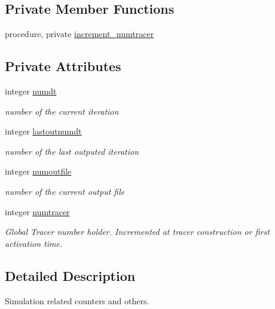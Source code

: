 \subsection*{Private Member Functions}
\begin{DoxyCompactItemize}
\item 
procedure, private \mbox{\hyperlink{structsimulationglobals__mod_1_1sim__t_afef25e0feaad4ec1cff7afd93bc53812}{increment\+\_\+numtracer}}
\end{DoxyCompactItemize}
\subsection*{Private Attributes}
\begin{DoxyCompactItemize}
\item 
integer \mbox{\hyperlink{structsimulationglobals__mod_1_1sim__t_acf2dd4822ebd48541ac6d018038b286a}{numdt}}
\begin{DoxyCompactList}\small\item\em number of the current iteration \end{DoxyCompactList}\item 
integer \mbox{\hyperlink{structsimulationglobals__mod_1_1sim__t_a09270b8350c388b420492cd2209bb1dd}{lastoutnumdt}}
\begin{DoxyCompactList}\small\item\em number of the last outputed iteration \end{DoxyCompactList}\item 
integer \mbox{\hyperlink{structsimulationglobals__mod_1_1sim__t_a5ae529652641c13a5471697d84b5db77}{numoutfile}}
\begin{DoxyCompactList}\small\item\em number of the current output file \end{DoxyCompactList}\item 
integer \mbox{\hyperlink{structsimulationglobals__mod_1_1sim__t_a23cc2df1e0cf56990759076ed07b69f1}{numtracer}}
\begin{DoxyCompactList}\small\item\em Global Tracer number holder. Incremented at tracer construction or first activation time. \end{DoxyCompactList}\end{DoxyCompactItemize}


\subsection{Detailed Description}
Simulation related counters and others. 

